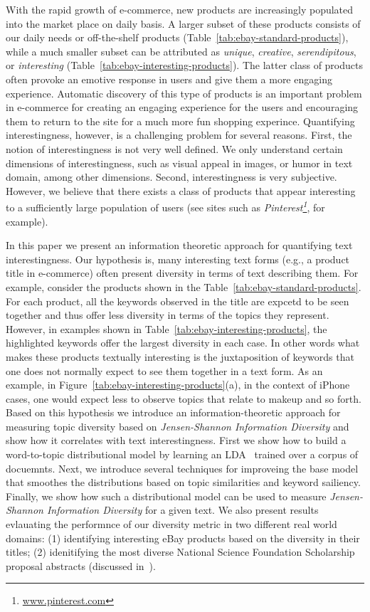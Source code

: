 


With the rapid growth of e-commerce, new products are increasingly populated into the market place on daily basis.  A larger subset of these products consists of our daily needs or off-the-shelf products (Table~\ref{tab:ebay-standard-products}), while a much smaller subset can be attributed as {\em unique}, {\em creative}, {\em serendipitous}, or {\em interesting} (Table~\ref{tab:ebay-interesting-products}). The latter class of products often provoke an emotive response in users and give them a more engaging experience. Automatic discovery of this type of products is an important problem in e-commerce for creating an engaging experience for the users and encouraging them to return to the site for a much more fun shopping experince. Quantifying interestingness, however,  is a challenging problem for several reasons. First, the notion of interestingness is not very well defined. We only understand certain dimensions of interestingness, such as visual appeal in images, or humor in text domain, among other dimensions. Second, interestingness is very subjective. However, we believe that there exists a class of products that appear interesting to a sufficiently large population of users (see sites such as {\em Pinterest\footnote{\url{www.pinterest.com}}}, for example).  

In this paper we present an information theoretic approach for quantifying text interestingness. Our hypothesis is, many interesting text forms (e.g., a product title in e-commerce) often present diversity in terms of text describing them. For example, consider the products shown in the Table~\ref{tab:ebay-standard-products}. For each product, all the keywords observed in the title are expcetd to be seen together and thus offer less diversity in terms of the topics they represent. However, in examples shown in Table~\ref{tab:ebay-interesting-products}, the highlighted keywords 
offer the largest diversity in each case. In other words what makes these products textually interesting is the juxtaposition of keywords that one does not normally expect to see them together in a text form. As an example, in Figure~\ref{tab:ebay-interesting-products}(a), in the context of iPhone cases, one would expect less to observe topics that relate to makeup and so forth. Based on this hypothesis we introduce an information-theoretic approach for measuring topic diversity based on {\em Jensen-Shannon Information Diversity} and show how it correlates with text interestingness. First we show how to build a word-to-topic distributional model by learning an LDA~\cite{Blei:2003:LDA:944919.944937} trained over a corpus of docuemnts. Next, we introduce several techniques for improveing the base model that smoothes the distributions based on topic similarities and keyword sailiency. Finally, we show how such a distributional model can be used to measure {\em Jensen-Shannon Information Diversity} for a given text. We also present results evlauating the performnce of our diversity metric in two different real world domains: (1) identifying interesting eBay products based on the diversity in their titles; (2) idenitifying the most diverse National Science Foundation Scholarship proposal abstracts (discussed in~\cite{bache:2013}). 

